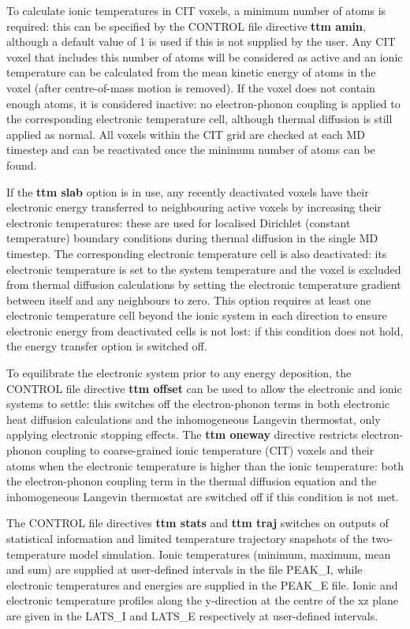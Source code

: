 To calculate ionic temperatures in CIT voxels, a minimum number of 
atoms is required: this can be specified by the CONTROL file directive 
{\bf ttm amin}, although a default value of 1 is used if this is not supplied 
by the user. Any CIT voxel that includes this number of atoms will be 
considered as active and an ionic temperature can be calculated from 
the mean kinetic energy of atoms in the voxel (after centre-of-mass 
motion is removed). If the voxel does not contain enough atoms, it is 
considered inactive: no electron-phonon coupling is applied to the 
corresponding electronic temperature cell, although thermal diffusion is 
still applied as normal. All voxels within the CIT grid are checked 
at each MD timestep and can be reactivated once the minimum number 
of atoms can be found. 

If the {\bf ttm slab} option is in use, any recently deactivated voxels 
have their electronic energy transferred to neighbouring active voxels 
by increasing their electronic temperatures: these are used for localised 
Dirichlet (constant temperature) boundary conditions during thermal 
diffusion in the single MD timestep. The corresponding electronic 
temperature cell is also deactivated: its electronic temperature is set to 
the system temperature and the voxel is excluded from thermal diffusion 
calculations by setting the electronic temperature gradient between itself 
and any neighbours to zero. This option requires at least one electronic 
temperature cell beyond the ionic system in each direction to ensure 
electronic energy from deactivated cells is not lost: if this condition 
does not hold, the energy transfer option is switched off.

To equilibrate the electronic system prior to any energy deposition, 
the CONTROL file directive {\bf ttm offset} can be used to allow the 
electronic and ionic systems to settle: this switches off the 
electron-phonon terms in both electronic heat diffusion calculations 
and the inhomogeneous Langevin thermostat, only applying 
electronic stopping effects. The {\bf ttm oneway} directive restricts 
electron-phonon coupling to coarse-grained ionic temperature (CIT) 
voxels and their atoms when the electronic temperature is higher 
than the ionic temperature: both the electron-phonon coupling term 
in the thermal diffusion equation and the inhomogeneous Langevin 
thermostat are switched off if this condition is not met.

The CONTROL file directives {\bf ttm stats} and {\bf ttm traj} switches 
on outputs of statistical information and limited temperature trajectory 
snapshots of the two-temperature model simulation. Ionic 
temperatures (minimum, maximum, mean and sum) are supplied at 
user-defined intervals in the file PEAK\_I, while electronic temperatures 
and energies are supplied in the PEAK\_E file. Ionic and electronic 
temperature profiles along the y-direction at the centre of the xz plane 
are given in the LATS\_I and LATS\_E respectively at user-defined 
intervals.

